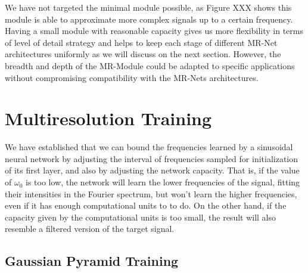 {We have not targeted the minimal module possible, as Figure XXX shows this module is able to approximate more complex signals up to a certain frequency. Having a small module with reasonable capacity gives us more flexibility in terms of level of detail strategy and helps to keep each stage of different MR-Net architectures uniformly as we will discuss on the next section. However, the breadth and depth of the MR-Module could be adapted to specific applications without compromising compatibility with the MR-Nets architectures.



\section{Multiresolution Training}

We have established that we can bound the frequencies learned by a sinusoidal neural network by adjusting the interval of frequencies sampled for initialization of its first layer, and also by adjusting the network capacity. That is, if the value of $\omega_0$ is too low, the network will learn the lower frequencies of the signal, fitting their intensities in the Fourier spectrum, but won't learn the higher frequencies, even if it has enough computational units to to do. On the other hand, if the capacity given by the computational units is too small, the result will also resemble a filtered version of the target signal.

\subsection{Gaussian Pyramid Training}

}
